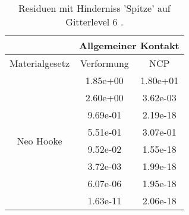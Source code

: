 \begin{table} 
\centering 
\begin{tabular}{c|cc|} 
\cline{2-3} 
 & \multicolumn{2}{|c|}{Allgemeiner Kontakt} \\ 
\hline 
\multicolumn{1}{|c|}{Materialgesetz} & \multicolumn{1}{c|}{Verformung} & \multicolumn{1}{c|}{NCP} \\ 
\hline 
\multicolumn{1}{|c|}{\multirow{8}{*}{Neo Hooke}} &\multicolumn{1}{|c|}{  1.85e+00} & \multicolumn{1}{|c|}{  1.80e+01} \\ 
\multicolumn{1}{|c|}{} & \multicolumn{1}{|c|}{  2.60e+00} & \multicolumn{1}{|c|}{  3.62e-03} \\ 
\multicolumn{1}{|c|}{} & \multicolumn{1}{|c|}{  9.69e-01} & \multicolumn{1}{|c|}{  2.19e-18} \\ 
\multicolumn{1}{|c|}{} & \multicolumn{1}{|c|}{  5.51e-01} & \multicolumn{1}{|c|}{  3.07e-01} \\ 
\multicolumn{1}{|c|}{} & \multicolumn{1}{|c|}{  9.52e-02} & \multicolumn{1}{|c|}{  1.55e-18} \\ 
\multicolumn{1}{|c|}{} & \multicolumn{1}{|c|}{  3.72e-03} & \multicolumn{1}{|c|}{  1.99e-18} \\ 
\multicolumn{1}{|c|}{} & \multicolumn{1}{|c|}{  6.07e-06} & \multicolumn{1}{|c|}{  1.95e-18} \\ 
\multicolumn{1}{|c|}{} & \multicolumn{1}{|c|}{  1.63e-11} & \multicolumn{1}{|c|}{  2.06e-18} \\ 
\hline 
\end{tabular}\caption{Residuen mit Hinderniss 'Spitze' auf Gitterlevel 6 .}\label{tab:Residuum_Spitze_level6}
\end{table} 
